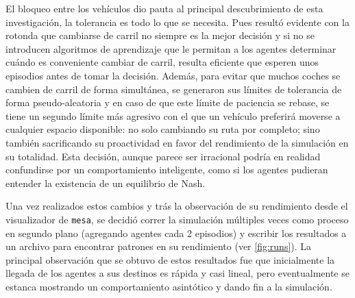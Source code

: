 \documentclass[twoside,11pt]{article}
\begin{document}
El bloqueo entre los vehículos dio pauta al principal descubrimiento de esta investigación, la tolerancia es todo lo que se necesita. Pues resultó evidente con la rotonda que cambiarse de carril no
siempre es la mejor decisión y si no se introducen algoritmos de aprendizaje que le permitan a los agentes determinar cuándo es conveniente cambiar de carril, resulta eficiente
que esperen unos episodios antes de tomar la decisión. Además, para evitar que muchos coches se cambien de carril de forma simultánea, se generaron sus límites de tolerancia de forma
pseudo-aleatoria y en caso de que este límite de paciencia se rebase, se tiene un segundo límite más agresivo con el que un vehículo preferirá moverse a cualquier espacio disponible: no solo cambiando su ruta 
por completo; sino también sacrificando su proactividad en favor del rendimiento de la simulación en su totalidad. Esta decisión, aunque parece ser irracional podría en realidad confundirse por un comportamiento
inteligente, como si los agentes pudieran entender la existencia de un equilibrio de Nash. 

Una vez realizados estos cambios y trás la observación de su rendimiento desde el visualizador de {\tt{mesa}}, se decidió correr la simulación múltiples veces
como proceso en segundo plano (agregando agentes cada 2 episodios) y escribir los resultados a un archivo para encontrar patrones en su rendimiento (ver \autoref{fig:runs}). 
La principal observación que se obtuvo de estos resultados fue que inicialmente la llegada de los agentes a sus destinos es rápida y casi lineal, pero eventualmente se 
estanca mostrando un comportamiento asintótico y dando fin a la simulación.
\end{document}
